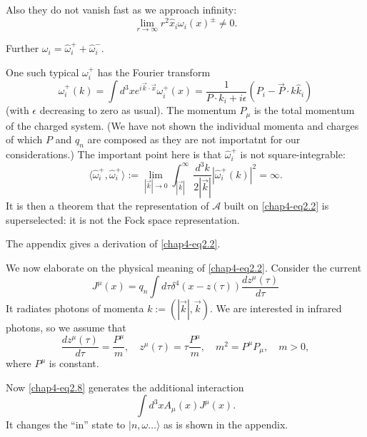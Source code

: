 Also they do not vanish fast as we approach infinity:
\begin{equation}
\lim\limits_{r\to\infty}r^{2}\hat{x}_{i}\omega_{i}(x)^{\pm}\neq 0.\label{chap4-eq2.5}
\end{equation}

Further $\omega_{i} = \hat{\omega}_{i}^{+} + \hat{\omega}_{i}^{-}$.

One such typical $\omega^{+}_{i}$ has the Fourier transform
\begin{equation}
\hat{\omega}_{i}^{+}(k)=\int d^{3}xe^{i\overrightarrow{k}\cdot \overrightarrow{x}}\omega^{+}_{i}(x)=\frac{1}{P\cdot k_{i}+i{\epsilon}}(P_{i}-\overrightarrow{P}\cdot \hat{k}\hat{k}_{i})\label{chap4-eq2.6}
\end{equation}
(with $\epsilon$ decreasing to zero as usual). The momentum $P_{\mu}$ is the total momentum of the charged system. (We have not shown the individual momenta and charges of which $P$ and $q_{n}$ are composed as they are not importatnt for our considerations.) The important point here is that $\hat{\omega}^{+}_{i}$ is not square-integrable:
\begin{equation}
\langle \hat{\omega}_{i}^{+},\hat{\omega}_{i}^{+}\rangle := \lim\limits_{|\overrightarrow{k}|\to 0}\int^{\infty}_{|\overrightarrow{k}|}\frac{d^{3}k}{2|\overrightarrow{k}|}|\hat{\omega}_{i}^{+}(k)|^{2}=\infty.\label{chap4-eq2.7}
\end{equation}
It is then a theorem \cite{chap4-key6} that the representation of $\mathcal{A}$ built on \eqref{chap4-eq2.2} is superselected: it is not the Fock space representation.

The appendix gives a derivation of \eqref{chap4-eq2.2}.

We now elaborate on the physical meaning of \eqref{chap4-eq2.2}. Consider the current
\begin{equation}
J^{\mu}(x)=q_{n}\int d\tau \delta^{4}(x-z(\tau))\frac{dz^{\mu}(\tau)}{d\tau}\label{chap4-eq2.8}
\end{equation}
It radiates photons of momenta $k := (| \overrightarrow{k}|, \overrightarrow{k})$. We are interested in infrared photons, so we assume that
\begin{equation}
\frac{dz^{\mu}(\tau)}{d\tau}=\dfrac{P^{\mu}}{m},\quad z^{\mu}(\tau)=\tau\frac{P^{\mu}}{m},\quad m^{2}=P^{\mu}P_{\mu},\quad m>0,\label{chap4-eq2.9}
\end{equation}
where $P^{\mu}$ is constant.

Now \eqref{chap4-eq2.8} generates the additional interaction
\begin{equation}
\int d^{3}xA_{\mu}(x)J^{\mu}(x).\label{chap4-eq2.10}
\end{equation}
It changes the ``in'' state to $|n,\omega\ldots\rangle$ as is shown in the appendix.

